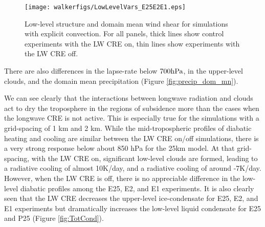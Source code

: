 \documentclass[draft]{agujournal2019}
\begin{document}
\begin{figure}
  \centering
    \texttt{[image: walkerfigs/LowLevelVars\_E25E2E1.eps]}
    \caption{Low-level structure and domain mean wind shear for simulations with explicit convection.  
    For all panels, thick lines show control experiments with the LW CRE on, thin lines show experiments
    with the LW CRE off.}
    \label{fig:enthalpy}
\end{figure}
  
  
  


There are also differences in the lapse-rate below $700 \rm{hPa}$, in the upper-level clouds,
and the domain mean precipitation (Figure \ref{fig:precip_dom_mn}).
  
We can see clearly that the interactions between longwave radiation and clouds act to dry the troposphere in the regions of subsidence 
more than the cases when the longwave CRE is not active.  This is especially true for the simulations with a grid-spacing of 1 km 
and 2 km.  While the mid-tropospheric profiles of diabatic heating and cooling are similar between the LW CRE on/off simulations, 
there is a very strong response below about 850 hPa for the 25km model.  At that grid-spacing, with the 
LW CRE on, significant low-level clouds are formed, leading to a radiative cooling of almost 10K/day, 
and a radiative cooling of around -7K/day.   However, when the LW CRE is off, there is no appreciable 
difference in the low-level diabatic profiles among the E25, E2, and E1 experiments.   It 
is also clearly seen that the LW CRE decreases the upper-level ice-condensate for E25, E2, and E1 
experiments but dramatically increases the low-level liquid condensate for E25 and P25 (Figure 
\ref{fig:TotCond}).  
\end{document}
